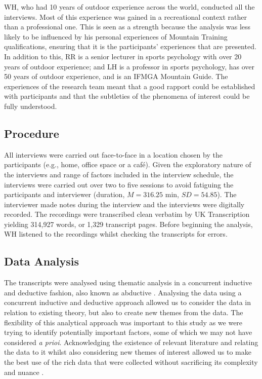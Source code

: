 \documentclass[
  12pt,
  a4paper,
]{book}
\begin{document}
WH, who had 10 years of outdoor experience across the world, conducted all the interviews. Most of this experience was gained in a recreational context rather than a professional one. This is seen as a strength because the analysis was less likely to be influenced by his personal experiences of Mountain Training qualifications, ensuring that it is the participants' experiences that are presented. In addition to this, RR is a senior lecturer in sports psychology with over 20 years of outdoor experience; and LH is a professor in sports psychology, has over 50 years of outdoor experience, and is an IFMGA Mountain Guide. The experiences of the research team meant that a good rapport could be established with participants and that the subtleties of the phenomena of interest could be fully understood.

\hypertarget{procedure}{%
\subsection{Procedure}\label{procedure}}

All interviews were carried out face-to-face in a location chosen by the participants (e.g., home, office space or a café). Given the exploratory nature of the interviews and range of factors included in the interview schedule, the interviews were carried out over two to five sessions to avoid fatiguing the participants and interviewer (duration, \(M = 316.25\) min, \(SD = 54.85\)). The interviewer made notes during the interview and the interviews were digitally recorded. The recordings were transcribed clean verbatim by UK Transcription yielding 314,927 words, or 1,329 transcript pages. Before beginning the analysis, WH listened to the recordings whilst checking the transcripts for errors.

\hypertarget{data-analysis}{%
\subsection{Data Analysis}\label{data-analysis}}

The transcripts were analysed using thematic analysis in a concurrent inductive and deductive fashion, also known as abductive \citep[cf.~][]{Webster2017}. Analysing the data using a concurrent inductive and deductive approach allowed us to consider the data in relation to existing theory, but also to create new themes from the data. The flexibility of this analytical approach was important to this study as we were trying to identify potentially important factors, some of which we may not have considered \emph{a prioi}. Acknowledging the existence of relevant literature and relating the data to it whilst also considering new themes of interest allowed us to make the best use of the rich data that were collected without sacrificing its complexity and nuance \citep[cf.~][]{YvonneFeilzer2009a}.
\end{document}
